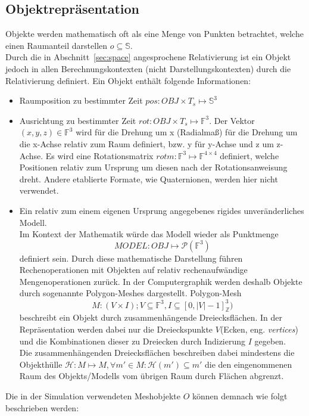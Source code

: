 \subsection{Objektrepräsentation}
\label{sec:objects_rep}
Objekte werden mathematisch oft als eine Menge von Punkten betrachtet, welche einen Raumanteil darstellen $ o \subseteq \mathbb{S}$.\\
Durch die in Abschnitt~\ref{sec:space} angesprochene Relativierung ist ein Objekt jedoch in allen Berechnungskontexten (nicht Darstellungskontexten) durch die Relativierung definiert. Ein Objekt enthält folgende Informationen:
\begin{itemize}
\item Raumposition zu bestimmter Zeit $pos : OBJ \times T_s \mapsto \mathbb{S}^3$
\item Ausrichtung zu bestimmter Zeit $rot : OBJ \times T_s \mapsto \mathbb{F}^3$. Der Vektor $(x, y, z) \in\mathbb{F}^3$ wird für die Drehung um x (Radialmaß) für die Drehung um die x-Achse relativ zum Raum definiert, bzw. y für y-Achse und z um z-Achse. Es wird eine Rotationsmatrix $rotm: \mathbb{F}^3 \mapsto \mathbb{F}^{4\times 4}$ definiert, welche Positionen relativ zum Ursprung um diesen nach der Rotationsanweisung dreht. Andere etablierte Formate, wie Quaternionen, werden hier nicht verwendet.
\item Ein relativ zum einem eigenen Ursprung angegebenes rigides unveränderliches Modell.\\
\sloppy
Im Kontext der Mathematik würde das Modell wieder als Punktmenge $$ MODEL : OBJ \mapsto \mathcal{P}(\mathbb{F}^3) $$ definiert sein.
\fussy
Durch diese mathematische Darstellung führen Rechenoperationen mit Objekten auf relativ rechenaufwändige Mengenoperationen zurück. In der Computergraphik werden deshalb Objekte durch sogenannte Polygon-Meshes dargestellt. 
Polygon-Mesh $$M: (V \times I); V \subseteq \mathbb{F}^3, I \subseteq [0, |V|-1]_\mathbb{Z}^3 )$$ beschreibt ein Objekt durch zusammenhängende Dreiecksflächen. In der Repräsentation werden dabei nur die Dreieckspunkte $V$(Ecken, eng. \textit{vertices}) und die Kombinationen dieser zu Dreiecken durch Indizierung $I$ gegeben.\\
Die zusammenhängenden Dreiecksflächen beschreiben dabei mindestens die Objekthülle $\mathcal{H}: M \mapsto M, \forall m'\in M: \mathcal{H}(m') \subseteq m'$ die den eingenommenen Raum des Objekts/Modells vom übrigen Raum durch Flächen abgrenzt.
\end{itemize}  
Die in der Simulation verwendeten Meshobjekte $O$ können demnach wie folgt beschrieben werden:
